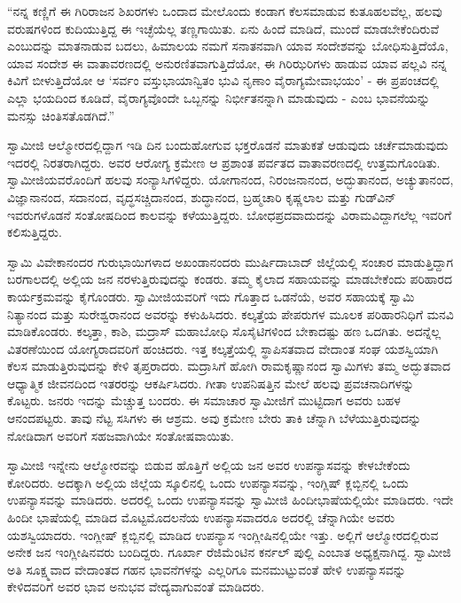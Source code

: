  “ನನ್ನ ಕಣ್ಣಿಗೆ ಈ ಗಿರಿರಾಜನ ಶಿಖರಗಳು ಒಂದಾದ ಮೇಲೊಂದು ಕಂಡಾಗ ಕೆಲಸಮಾಡುವ ಕುತೂಹಲವೆಲ್ಲ, ಹಲವು ವರುಷಗಳಿಂದ ಕುದಿಯುತ್ತಿದ್ದ ಈ ಇಚ್ಛೆಯೆಲ್ಲ ತಣ್ಣಗಾಯಿತು. ಏನು ಹಿಂದೆ ಮಾಡಿದೆ, ಮುಂದೆ ಮಾಡಬೇಕೆಂದಿರುವೆ ಎಂಬುದನ್ನು ಮಾತನಾಡುವ ಬದಲು, ಹಿಮಾಲಯ ನಮಗೆ ಸನಾತನವಾಗಿ ಯಾವ ಸಂದೇಶವನ್ನು ಬೋಧಿಸುತ್ತಿದೆಯೊ, ಯಾವ ಸಂದೇಶ ಈ ವಾತಾವರಣದಲ್ಲಿ ಅನುರಣಿತವಾಗುತ್ತಿದೆಯೋ, ಈ ಗಿರಿಝರಿಗಳು ಹಾಡುವ ಯಾವ ಪಲ್ಲವಿ ನನ್ನ ಕಿವಿಗೆ ಬೀಳುತ್ತಿದೆಯೋ ಆ ‘ಸರ್ವಂ ವಸ್ತುಭಾಯಾನ್ವಿತಂ ಭುವಿ ನೃಣಾಂ ವೈರಾಗ್ಯಮೇವಾಭಯಂ’ - ಈ ಪ್ರಪಂಚದಲ್ಲಿ ಎಲ್ಲಾ ಭಯದಿಂದ ಕೂಡಿದೆ, ವೈರಾಗ್ಯವೊಂದೇ ಒಬ್ಬನನ್ನು ನಿರ್ಭೀತನನ್ನಾಗಿ ಮಾಡುವುದು - ಎಂಬ ಭಾವನೆಯನ್ನು ಮನಸ್ಸು ಚಿಂತಿಸತೊಡಗಿದೆ.” 

 ಸ್ವಾಮೀಜಿ ಆಲ್ಮೋರದಲ್ಲಿದ್ದಾಗ ಇಡಿ ದಿನ ಬಂದುಹೋಗುವ ಭಕ್ತರೊಡನೆ ಮಾತುಕತೆ ಆಡುವುದು ಚರ್ಚೆಮಾಡುವುದು ಇದರಲ್ಲಿ ನಿರತರಾಗಿದ್ದರು. ಅವರ ಆರೋಗ್ಯ ಕ್ರಮೇಣ ಆ ಪ್ರಶಾಂತ ಪರ್ವತದ ವಾತಾವರಣದಲ್ಲಿ ಉತ್ತಮಗೊಂಡಿತು. ಸ್ವಾಮೀಜಿಯವರೊಂದಿಗೆ ಹಲವು ಸಂನ್ಯಾಸಿಗಳಿದ್ದರು. ಯೋಗಾನಂದ, ನಿರಂಜನಾನಂದ, ಅದ್ಭುತಾನಂದ, ಅಚ್ಯುತಾನಂದ, ವಿಜ್ಞಾನಾನಂದ, ಸದಾನಂದ, ವೃದ್ಧಸಚ್ಚಿದಾನಂದ, ಶುದ್ಧಾನಂದ, ಬ್ರಹ್ಮಚಾರಿ ಕೃಷ್ಣಲಾಲ ಮತ್ತು ಗುಡ್‍ವಿನ್ ಇವರುಗಳೊಡನೆ ಸಂತೋಷದಿಂದ ಕಾಲವನ್ನು ಕಳೆಯುತ್ತಿದ್ದರು. ಬೋಧಪ್ರದವಾದುದನ್ನು ವಿರಾಮವಿದ್ದಾಗಲೆಲ್ಲ ಇವರಿಗೆ ಕಲಿಸುತ್ತಿದ್ದರು. 

 ಸ್ವಾಮಿ ವಿವೇಕಾನಂದರ ಗುರುಭಾಯಿಗಳಾದ ಅಖಂಡಾನಂದರು ಮುರ್ಷಿದಾಬಾದ್ ಜಿಲ್ಲೆಯಲ್ಲಿ ಸಂಚಾರ ಮಾಡುತ್ತಿದ್ದಾಗ ಬರಗಾಲದಲ್ಲಿ ಅಲ್ಲಿಯ ಜನ ನರಳುತ್ತಿರುವುದನ್ನು ಕಂಡರು. ತಮ್ಮ ಕೈಲಾದ ಸಹಾಯವನ್ನು ಮಾಡಬೇಕೆಂದು ಪರಿಹಾರದ ಕಾರ್ಯಕ್ರಮವನ್ನು ಕೈಗೊಂಡರು. ಸ್ವಾಮೀಜಿಯವರಿಗೆ ಇದು ಗೊತ್ತಾದ ಒಡನೆಯೆ, ಅವರ ಸಹಾಯಕ್ಕೆ ಸ್ವಾಮಿ ನಿತ್ಯಾನಂದ ಮತ್ತು ಸುರೇಶ್ವರಾನಂದ ಅವರನ್ನು ಕಳುಹಿಸಿದರು. ಕಲ್ಕತ್ತೆಯ ಪೇಪರುಗಳ ಮೂಲಕ ಪರಿಹಾರನಿಧಿಗೆ ಮನವಿ ಮಾಡಿಕೊಂಡರು. ಕಲ್ಕತ್ತಾ, ಕಾಶಿ, ಮದ್ರಾಸ್ ಮಹಾಬೋಧಿ ಸೊಸೈಟಿಗಳಿಂದ ಬೇಕಾದಷ್ಟು ಹಣ ಒದಗಿತು. ಅದನ್ನೆಲ್ಲ ವಿತರಣೆಯಿಂದ ಯೋಗ್ಯರಾದವರಿಗೆ ಹಂಚಿದರು. ಇತ್ತ ಕಲ್ಕತ್ತೆಯಲ್ಲಿ ಸ್ಥಾಪಿಸತವಾದ ವೇದಾಂತ ಸಂಘ ಯಶಸ್ವಿಯಾಗಿ ಕೆಲಸ ಮಾಡುತ್ತಿರುವುದನ್ನು ಕೇಳಿ ತೃಪ್ತರಾದರು. ಮದ್ರಾಸಿಗೆ ಹೋಗಿ ರಾಮಕೃಷ್ಣಾನಂದ ಸ್ವಾಮಿಗಳು ತಮ್ಮ ಅದ್ಭುತವಾದ ಆಧ್ಯಾತ್ಮಿಕ ಜೀವನದಿಂದ ಇತರರನ್ನು ಆಕರ್ಷಿಸಿದರು. ಗೀತಾ ಉಪನಿಷತ್ತಿನ ಮೇಲೆ ಹಲವು ಪ್ರವಚನಾದಿಗಳನ್ನು ಕೊಟ್ಟರು. ಜನರು ಇದನ್ನು ಮೆಚ್ಚುತ್ತ ಬಂದರು. ಈ ಸಮಾಚಾರ ಸ್ವಾಮೀಜಿಗೆ ಮುಟ್ಟಿದಾಗ ಅವರು ಬಹಳ ಆನಂದಪಟ್ಟರು. ತಾವು ನೆಟ್ಟ ಸಸಿಗಳು ಈ ಆಶ್ರಮ. ಅವು ಕ್ರಮೇಣ ಬೇರು ತಾಕಿ ಚೆನ್ನಾಗಿ ಬೆಳೆಯುತ್ತಿರುವುದನ್ನು ನೋಡಿದಾಗ ಅವರಿಗೆ ಸಹಜವಾಗಿಯೇ ಸಂತೋಷವಾಯಿತು. 

 ಸ್ವಾಮೀಜಿ ಇನ್ನೇನು ಆಲ್ಮೋರವನ್ನು ಬಿಡುವ ಹೊತ್ತಿಗೆ ಅಲ್ಲಿಯ ಜನ ಅವರ ಉಪನ್ಯಾಸವನ್ನು ಕೇಳಬೇಕೆಂದು ಕೋರಿದರು. ಅದಕ್ಕಾಗಿ ಅಲ್ಲಿಯ ಜಿಲ್ಲೆಯ ಸ್ಕೂಲಿನಲ್ಲಿ ಒಂದು ಉಪನ್ಯಾಸವನ್ನು, ಇಂಗ್ಲಿಷ್ ಕ್ಲಬ್ಬಿನಲ್ಲಿ ಒಂದು ಉಪನ್ಯಾಸವನ್ನು ಮಾಡಿದರು. ಅದರಲ್ಲಿ ಒಂದು ಉಪನ್ಯಾಸವನ್ನು ಸ್ವಾಮೀಜಿ ಹಿಂದೀಭಾಷೆಯಲ್ಲಿಯೇ ಮಾಡಿದರು. ಇದೇ ಹಿಂದೀ ಭಾಷೆಯಲ್ಲಿ ಮಾಡಿದ ಮೊಟ್ಟಮೊದಲನೆಯ ಉಪನ್ಯಾಸವಾದರೂ ಅದರಲ್ಲಿ ಚೆನ್ನಾಗಿಯೇ ಅವರು ಯಶಸ್ವಿಯಾದರು. ಇಂಗ್ಲೀಷ್ ಕ್ಲಬ್ಬಿನಲ್ಲಿ ಮಾಡಿದ ಉಪನ್ಯಾಸ ಇಂಗ್ಲೀಷಿನಲ್ಲಿಯೇ ಇತ್ತು. ಅಲ್ಲಿಗೆ ಆಲ್ಮೋರದಲ್ಲಿರುವ ಅನೇಕ ಜನ ಇಂಗ್ಲೀಷಿನವರು ಬಂದಿದ್ದರು. ಗೂರ್ಖಾ ರೆಜಿಮೆಂಟಿನ ಕರ್ನಲ್ ಪುಲ್ಲಿ ಎಂಬಾತ ಅಧ್ಯಕ್ಷನಾಗಿದ್ದ. ಸ್ವಾಮೀಜಿ ಅತಿ ಸೂಕ್ಷ್ಮವಾದ ವೇದಾಂತದ ಗಹನ ಭಾವನೆಗಳನ್ನು ಎಲ್ಲರಿಗೂ ಮನಮುಟ್ಟುವಂತೆ ಹೇಳಿ ಉಪನ್ಯಾಸವನ್ನು ಕೇಳಿದವರಿಗೆ ಅವರ ಭಾವ ಅನುಭವ ವೇದ್ಯವಾಗುವಂತೆ ಮಾಡಿದರು. 

